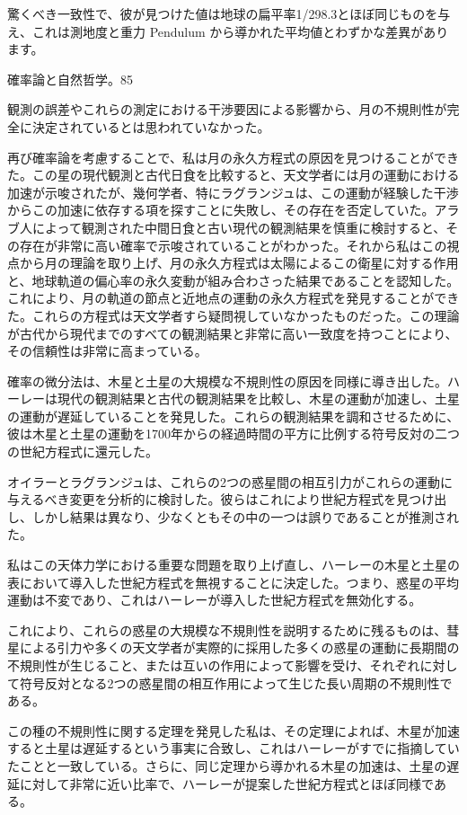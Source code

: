 \documentclass[a4paper,11pt,openany]{ltjsbook}
\begin{document}
驚くべき一致性で、彼が見つけた値は地球の扁平率1/298.3とほぼ同じものを与え、これは測地度と重力 Pendulum から導かれた平均値とわずかな差異があります。

確率論と自然哲学。85

観測の誤差やこれらの測定における干渉要因による影響から、月の不規則性が完全に決定されているとは思われていなかった。

再び確率論を考慮することで、私は月の永久方程式の原因を見つけることができた。この星の現代観測と古代日食を比較すると、天文学者には月の運動における加速が示唆されたが、幾何学者、特にラグランジュは、この運動が経験した干渉からこの加速に依存する項を探すことに失敗し、その存在を否定していた。アラブ人によって観測された中間日食と古い現代の観測結果を慎重に検討すると、その存在が非常に高い確率で示唆されていることがわかった。それから私はこの視点から月の理論を取り上げ、月の永久方程式は太陽によるこの衛星に対する作用と、地球軌道の偏心率の永久変動が組み合わさった結果であることを認知した。これにより、月の軌道の節点と近地点の運動の永久方程式を発見することができた。これらの方程式は天文学者すら疑問視していなかったものだった。この理論が古代から現代までのすべての観測結果と非常に高い一致度を持つことにより、その信頼性は非常に高まっている。

確率の微分法は、木星と土星の大規模な不規則性の原因を同様に導き出した。ハーレーは現代の観測結果と古代の観測結果を比較し、木星の運動が加速し、土星の運動が遅延していることを発見した。これらの観測結果を調和させるために、彼は木星と土星の運動を1700年からの経過時間の平方に比例する符号反対の二つの世紀方程式に還元した。

オイラーとラグランジュは、これらの2つの惑星間の相互引力がこれらの運動に与えるべき変更を分析的に検討した。彼らはこれにより世紀方程式を見つけ出し、しかし結果は異なり、少なくともその中の一つは誤りであることが推測された。

私はこの天体力学における重要な問題を取り上げ直し、ハーレーの木星と土星の表において導入した世紀方程式を無視することに決定した。つまり、惑星の平均運動は不変であり、これはハーレーが導入した世紀方程式を無効化する。

これにより、これらの惑星の大規模な不規則性を説明するために残るものは、彗星による引力や多くの天文学者が実際的に採用した多くの惑星の運動に長期間の不規則性が生じること、または互いの作用によって影響を受け、それぞれに対して符号反対となる2つの惑星間の相互作用によって生じた長い周期の不規則性である。

この種の不規則性に関する定理を発見した私は、その定理によれば、木星が加速すると土星は遅延するという事実に合致し、これはハーレーがすでに指摘していたことと一致している。さらに、同じ定理から導かれる木星の加速は、土星の遅延に対して非常に近い比率で、ハーレーが提案した世紀方程式とほぼ同様である。
\end{document}
